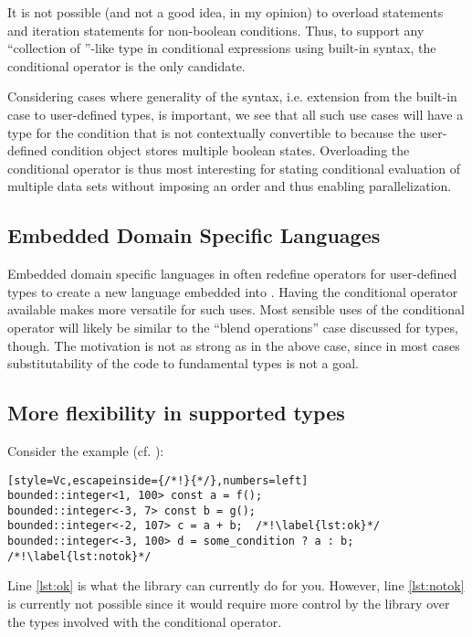 It is not possible (and not a good idea, in my opinion) to overload  statements and iteration statements for non-boolean conditions.
Thus, to support any “collection of \bool{}”-like type in conditional expressions using built-in syntax, the conditional operator is the only candidate.

Considering cases where generality of the syntax, i.e. extension from the built-in case to user-defined types, is important, we see that all such use cases will have a type for the condition that is not contextually convertible to \bool because the user-defined condition object stores multiple boolean states.
Overloading the conditional operator is thus most interesting for stating conditional evaluation of multiple data sets without imposing an order and thus enabling parallelization.

\subsection{Embedded Domain Specific Languages}
Embedded domain specific languages in \CC{} often redefine operators for user-defined types to create a new language embedded into \CC{}.
Having the conditional operator available makes \CC{} more versatile for such uses.
Most sensible uses of the conditional operator will likely be similar to the “blend operations” case discussed for  types, though.
The motivation is not as strong as in the above case, since in most cases substitutability of the code to fundamental types is not a goal.

\subsection{More flexibility in supported types}
Consider the  example (cf. \cite{site.bounded-integer}):
\smallskip\begin{lstlisting}[style=Vc,escapeinside={/*!}{*/},numbers=left]
bounded::integer<1, 100> const a = f();
bounded::integer<-3, 7> const b = g();
bounded::integer<-2, 107> c = a + b;  /*!\label{lst:ok}*/
bounded::integer<-3, 100> d = some_condition ? a : b;  /*!\label{lst:notok}*/
\end{lstlisting}

Line \ref{lst:ok} is what the  library can currently do for you.
However, line \ref{lst:notok} is currently not possible since it would require more control by the library over the types involved with the conditional operator.

